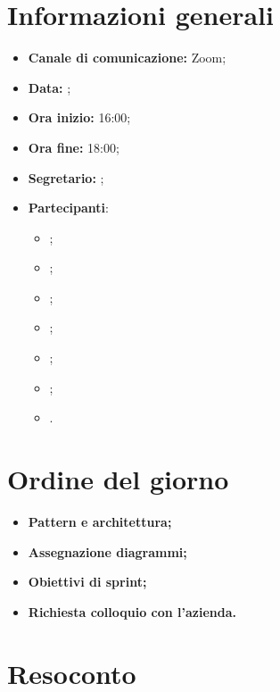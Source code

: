 \section{Informazioni generali}

\begin{itemize}

    \item \textbf{Canale di comunicazione:} Zoom;

    \item \textbf{Data:} \DataMeeting{};

    \item \textbf{Ora inizio:} 16:00;

    \item \textbf{Ora fine:} 18:00;

    \item \textbf{Segretario:} \ACapoRedazione{};

    \item \textbf{Partecipanti}: 
        \begin{itemize}
            \item \Daniele{};
            \item \Davide{};
            \item \Francesco{};
            \item \Giosue{};
            \item \Lucrezia{};
            \item \Matteo{};
            \item \Tommaso{}.
        \end{itemize}
\end{itemize}

\section{Ordine del giorno}

\begin{itemize}
    \item\textbf{Pattern e architettura;}
    \item\textbf{Assegnazione diagrammi;}
    \item\textbf{Obiettivi di sprint;}
    \item\textbf{Richiesta colloquio con l'azienda.}
\end{itemize}
\newpage


\section{Resoconto}
